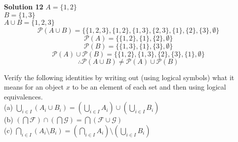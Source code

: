 \textbf{Solution 12}
$A = \{1, 2\}$ \\
$B = \{1, 3\}$ \\
$A \cup B = \{1, 2, 3\}$
\[\mathcal{P}(A \cup B) = \{\{1, 2, 3\}, \{1, 2\}, \{1, 3\}, \{2, 3\}, \{1\}, \{2\}, \{3\}, \emptyset\}\]
\[\mathcal{P}(A) = \{\{1, 2\}, \{1\}, \{2\}, \emptyset\}\]
\[\mathcal{P}(B) = \{\{1, 3\}, \{1\}, \{3\}, \emptyset\}\]
\[\mathcal{P}(A) \cup \mathcal{P}(B) = \{\{1, 2\}, \{1, 3\}, \{2\}, \{3\}, \{1\}, \emptyset\}\]
\[\therefore \mathcal{P}(A \cup B) \not = \mathcal{P}(A) \cup \mathcal{P}(B)\]

\begin{tcolorbox}[title=Problem 13, breakable]
    Verify the following identities by writing out (using logical symbols) what it means
    for an object $x$ to be an element of each set and then using logical equivalences. \\
    (a) $\bigcup_{i \in I}(A_i \cup B_i) = (\bigcup_{i \in I}A_i) \cup (\bigcup_{i \in I} B_i)$ \\
    (b) $(\bigcap \mathcal{F}) \cap (\bigcap \mathcal{G}) = \bigcap(\mathcal{F} \cup \mathcal{G})$ \\
    (c) $\bigcap_{i \in I}(A_i \setminus B_i) = (\bigcap_{i \in I} A_i) \setminus (\bigcup_{i \in I} B_i)$
\end{tcolorbox}

